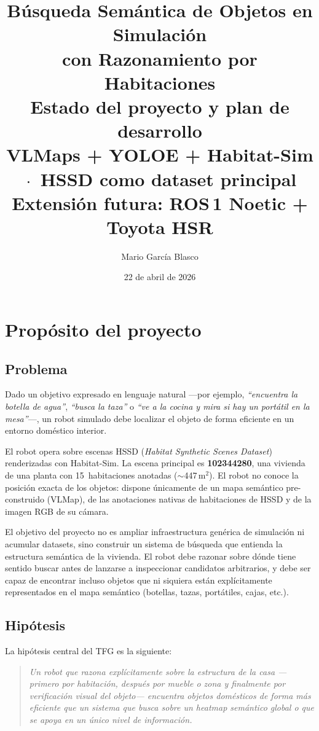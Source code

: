 \documentclass[11pt,a4paper]{article}
\title{\textbf{Búsqueda Semántica de Objetos en Simulación\\con Razonamiento por Habitaciones}\\[6pt]
\large Estado del proyecto y plan de desarrollo\\[4pt]
\normalsize VLMaps + YOLOE + Habitat-Sim \,$\cdot$\, HSSD como dataset principal\\
Extensión futura: ROS\,1 Noetic + Toyota HSR}
\author{Mario García Blasco}
\date{22 de abril de 2026}
\begin{document}
\maketitle
\tableofcontents
\newpage

\section{Propósito del proyecto}

\subsection{Problema}

Dado un objetivo expresado en lenguaje natural ---por ejemplo, \textit{``encuentra
la botella de agua''}, \textit{``busca la taza''} o \textit{``ve a la cocina y
mira si hay un portátil en la mesa''}---, un robot simulado debe localizar el
objeto de forma eficiente en un entorno doméstico interior.

El robot opera sobre escenas HSSD (\textit{Habitat Synthetic Scenes Dataset})
renderizadas con Habitat-Sim. La escena principal es \textbf{102344280}, una
vivienda de una planta con 15~habitaciones anotadas ($\sim$447\,m$^2$). El robot
no conoce la posición exacta de los objetos: dispone únicamente de un mapa
semántico pre-construido (VLMap), de las anotaciones nativas de habitaciones de
HSSD y de la imagen RGB de su cámara.

El objetivo del proyecto no es ampliar infraestructura genérica de simulación ni
acumular datasets, sino construir un sistema de búsqueda que entienda la
estructura semántica de la vivienda. El robot debe razonar sobre dónde tiene
sentido buscar antes de lanzarse a inspeccionar candidatos arbitrarios, y debe
ser capaz de encontrar incluso objetos que ni siquiera están explícitamente
representados en el mapa semántico (botellas, tazas, portátiles, cajas, etc.).

\subsection{Hipótesis}

La hipótesis central del TFG es la siguiente:

\begin{quote}
\textit{Un robot que razona explícitamente sobre la estructura de la casa
---primero por habitación, después por mueble o zona y finalmente por
verificación visual del objeto--- encuentra objetos domésticos de forma más
eficiente que un sistema que busca sobre un heatmap semántico global o que se
apoya en un único nivel de información.}
\end{quote}
\end{document}
